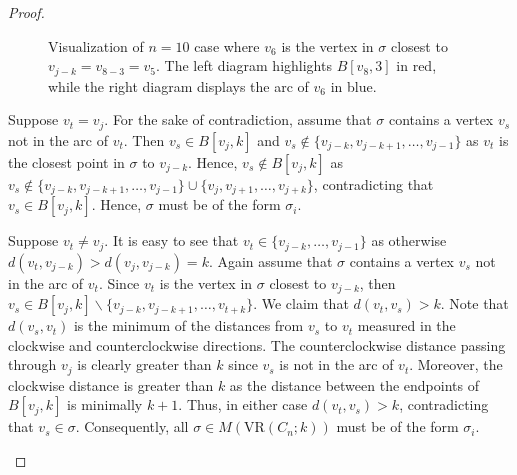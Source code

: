 \documentclass[12pt,a4paper]{amsart}
\theoremstyle{definition}
\newcommand{\vr}[2]{\mathrm{VR}(#1;#2)}
\numberwithin{equation}{section}
\begin{document}
\begin{proof}
\begin{figure}[h]
\begin{center}
\caption{Visualization of $n=10$ case where $v_6$ is the vertex in $\sigma$ closest to $v_{j-k}=v_{8-3}=v_5$.
The left diagram highlights $B[v_8,3]$ in red, while the right diagram displays the arc of $v_6$ in blue.}
\end{center}
\end{figure}


Suppose $v_t=v_j$.
For the sake of contradiction, assume that $\sigma$ contains a vertex $v_s$ not in the arc of $v_t$.
Then $v_s\in B[v_j,k]$ and $v_s\not\in\{v_{j-k}, v_{j-k+1},\ldots, v_{j-1}\}$ as $v_t$ is the closest point in $\sigma$ to $v_{j-k}$.
Hence, $v_s\not\in B[v_j,k]$ as $v_s\not\in\{v_{j-k}, v_{j-k+1},\ldots, v_{j-1}\}\cup\{v_j,v_{j+1},\ldots, v_{j+k}\}$, contradicting that $v_s\in B[v_j,k]$.
Hence, $\sigma$ must be of the form $\sigma_i$.

Suppose $v_t\neq v_j$.
It is easy to see that $v_t\in\{v_{j-k},\ldots, v_{j-1}\}$ as otherwise $d(v_t, v_{j-k})>d(v_j, v_{j-k})=k$.
Again assume that $\sigma$ contains a vertex $v_s$ not in the arc of $v_t$.
Since $v_t$ is the vertex in $\sigma$ closest to $v_{j-k}$, then $v_s\in B[v_j,k]\backslash\{v_{j-k}, v_{j-k+1}, \ldots, v_{t+k}\}$.
We claim that $d(v_t,v_s)>k$.
Note that $d(v_s,v_t)$ is the minimum of the distances from $v_s$ to $v_t$ measured in the clockwise and counterclockwise directions.
The counterclockwise distance passing through $v_j$ is clearly greater than $k$ since $v_s$ is not in the arc of $v_t$.
Moreover, the clockwise distance is greater than $k$ as the distance between the endpoints of $B[v_j, k]$ is minimally $k+1$.
Thus, in either case $d(v_t, v_s)>k$, contradicting that $v_s\in\sigma$.
Consequently, all $\sigma\in M(\vr{C_n}{k})$ must be of the form $\sigma_i$.

\begin{figure}[h]
\begin{center}
\end{center}
\end{figure}
\end{proof}
\end{document}
